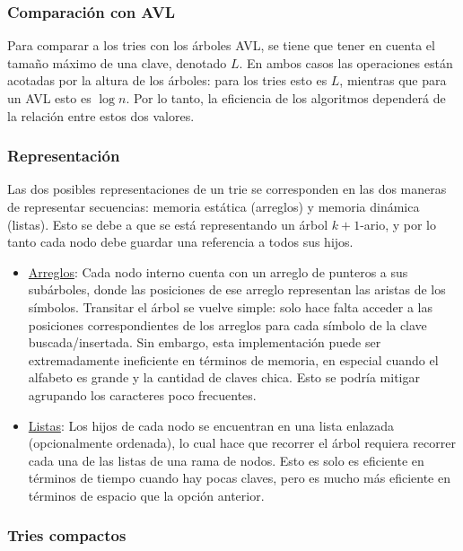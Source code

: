 \documentclass{article}
\begin{document}
    \subsubsection{Comparación con AVL}

    Para comparar a los tries con los árboles AVL, se tiene que tener en cuenta el tamaño máximo de una clave, denotado $L$. En ambos casos las operaciones están acotadas por la altura de los árboles: para los tries esto es $L$, mientras que para un AVL esto es $\log{n}$. Por lo tanto, la eficiencia de los algoritmos dependerá de la relación entre estos dos valores.

    \subsubsection{Representación}

    Las dos posibles representaciones de un trie se corresponden en las dos maneras de representar secuencias: memoria estática (arreglos) y memoria dinámica (listas). Esto se debe a que se está representando un árbol ${k+1}$-ario, y por lo tanto cada nodo debe guardar una referencia a todos sus hijos.

    \begin{itemize}
        \item \underline{Arreglos}: Cada nodo interno cuenta con un arreglo de punteros a sus subárboles, donde las posiciones de ese arreglo representan las aristas de los símbolos. Transitar el árbol se vuelve simple: solo hace falta acceder a las posiciones correspondientes de los arreglos para cada símbolo de la clave buscada/insertada. Sin embargo, esta implementación puede ser extremadamente ineficiente en términos de memoria, en especial cuando el alfabeto es grande y la cantidad de claves chica. Esto se podría mitigar agrupando los caracteres poco frecuentes.
        \item \underline{Listas}: Los hijos de cada nodo se encuentran en una lista enlazada (opcionalmente ordenada), lo cual hace que recorrer el árbol requiera recorrer cada una de las listas de una rama de nodos. Esto es solo es eficiente en términos de tiempo cuando hay pocas claves, pero es mucho más eficiente en términos de espacio que la opción anterior.
    \end{itemize}

    \subsubsection{Tries compactos}
\end{document}
